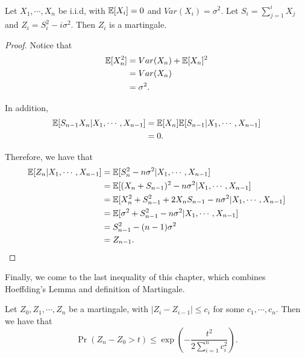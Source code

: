 \documentclass[../main.tex]{subfiles}
\begin{document}
\begin{example}
	Let $X_1, \cdots, X_n$ be i.i.d, with $\mathbb{E}[X_i] = 0$ and $Var(X_i) = \sigma^2$. Let $S_i = \sum\limits_{j = 1}^i X_j$ and $Z_i = S_i^2 - i\sigma^2$. Then $Z_i$ is a martingale.
\end{example}

\begin{proof}
	Notice that 
		\begin{equation*}
			\begin{aligned}
			\mathbb{E}[X_n^2] & = Var(X_n) + \mathbb{E}[X_n]^2 \\ &= Var(X_n) \\ & = \sigma^2.
			\end{aligned}
		\end{equation*}
		
	In addition, 
		\begin{equation*}
			\begin{aligned}
			\mathbb{E}[S_{n-1} X_n | X_1, \cdots, X_{n-1}] & = \mathbb{E}[X_n] \mathbb{E}[S_{n-1} | X_1, \cdots, X_{n-1}] \\
			& = 0.
			\end{aligned}
		\end{equation*}
	
	Therefore, we have that 
		\begin{equation*}
			\begin{aligned}
				\mathbb{E}[Z_n | X_1, \cdots , X_{n-1}] & = 	\mathbb{E}[S_n^2 - n\sigma^2 | X_1, \cdots , X_{n-1}]\\
				& = 	\mathbb{E}[(X_n + S_{n-1})^2 - n\sigma^2 | X_1, \cdots , X_{n-1}] \\
				& = 	\mathbb{E}[X_n^2 + S_{n-1}^2 + 2X_nS_{n-1} - n\sigma^2 | X_1, \cdots , X_{n-1}] \\
				& = \mathbb{E}[\sigma^2 + S_{n-1}^2 - n\sigma^2 | X_1, \cdots, X_{n-1}] \\
				& = S_{n-1}^2 - (n-1)\sigma^2 \\
				& = Z_{n-1}.
 			\end{aligned}
		\end{equation*}
\end{proof}

Finally, we come to the last inequality of this chapter, which combines Hoeffding's Lemma and definition of Martingale. 
\begin{theorem}
	Let $Z_0, Z_1, \cdots, Z_n$ be a martingale, with $|Z_i - Z_{i-1}| \leq c_i$ for some $c_1, \cdots, c_n$. Then we have that
	\begin{equation}
	\Pr(Z_n - Z_0 > t) \leq \exp(-\frac{t^2}{2 \sum\limits_{i = 1}^n c_i^2}).
	\end{equation}
\end{theorem}
\end{document}
